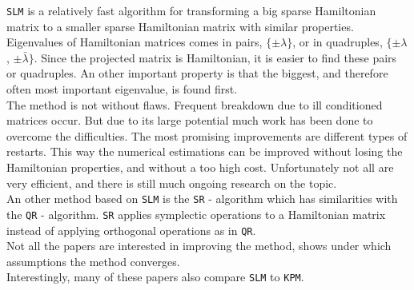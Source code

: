 \noindent \texttt{SLM} is a relatively fast algorithm for transforming a big sparse Hamiltonian matrix to a smaller sparse Hamiltonian matrix with similar properties. Eigenvalues of Hamiltonian matrices comes in pairs, $\{ \pm \lambda \} $, or in quadruples, $\{ \pm \lambda $, $\pm \bar{\lambda} \} $. Since the projected matrix is Hamiltonian, it is easier to find these pairs or quadruples. An other important property is that the biggest, and therefore often most important eigenvalue, is found first.\\

\noindent The method is not without flaws. Frequent breakdown due to ill conditioned matrices occur. But due to its large potential much work has been done to overcome the difficulties. The most promising improvements are different types of restarts. This way the numerical estimations can be improved without losing the Hamiltonian properties, and without a too high cost.
Unfortunately not all are very efficient, and there is still much ongoing research on the topic. \\

\noindent An other method based on \texttt{SLM} is the \texttt{SR} - algorithm which has similarities with the \texttt{QR} - algorithm. \texttt{SR} applies symplectic operations to a Hamiltonian matrix instead of applying orthogonal operations as in \texttt{QR}. \\

\noindent Not all the papers are interested in improving the method, \cite{SLM4} shows under which assumptions the method converges. \\

\noindent Interestingly, many of these papers also compare \texttt{SLM} to \texttt{KPM}.


 

